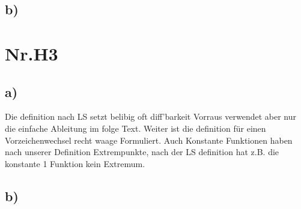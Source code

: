 \documentclass[12pt,a4paper,oneside,ngerman]{article}
\begin{document}
\subsection*{b)}


\section*{Nr.H3}

\subsection*{a)}

Die definition nach LS setzt belibig oft diff'barkeit Vorraus verwendet aber nur die einfache Ableitung im folge Text.
Weiter ist die definition für einen Vorzeichenwechsel recht waage Formuliert.
Auch Konstante Funktionen haben nach unserer Definition Extrempunkte, nach der LS definition
hat z.B. die konstante 1 Funktion kein Extremum.


\subsection*{b)}
	
\end{document}

